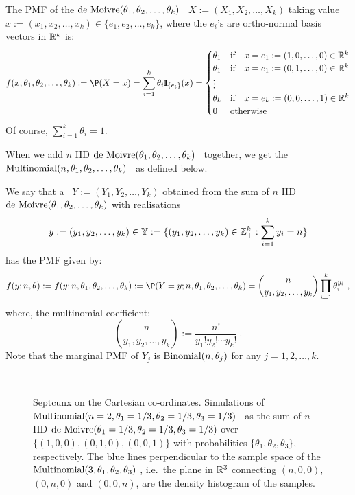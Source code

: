 \begin{model}\label{M:deMoivreRVec}
The PMF of the $\mbox{{\rm de~Moivre}}(\theta_1,\theta_2,\ldots,\theta_k)$ \rv~$X := (X_1,X_2,\ldots,X_k)$ taking value $x := (x_1,x_2,\ldots,x_k) \in \{e_1,e_2,\ldots,e_k\}$, where the $e_i$'s are ortho-normal basis vectors in $\mathbb{R}^k$ is:
\[
f(x;\theta_1,\theta_2,\ldots,\theta_k) := \P(X=x) = \sum_{i=1}^k \theta_i \BB{1}_{\{e_i\}}(x) =
\begin{cases}
\theta_1 & \text{if} \quad x=e_1:=(1,0,\ldots,0) \in \Rz^k \\
\theta_1 & \text{if} \quad x=e_1:=(0,1,\ldots,0) \in  \Rz^k \\
\vdots \\
\theta_k & \text{if} \quad x=e_k:=(0,0,\ldots,1) \in  \Rz^k \\
0 & \text{otherwise}
\end{cases}
\]
Of course, $\sum_{i=1}^k \theta_i = 1$.
\end{model}

When we add $n$ IID $\mbox{{\rm de~Moivre}}(\theta_1,\theta_2,\ldots,\theta_k)$ \rv~together, we get the $\mbox{{\rm Multinomial}}(n,\theta_1,\theta_2,\ldots,\theta_k)$ \rv~as defined below.

\begin{model}\label{M:Multinomial}
We say that a \rv~$Y:=(Y_1,Y_2,\ldots,Y_k)$ obtained from the sum of $n$ IID $\mbox{{\rm de~Moivre}}(\theta_1,\theta_2,\ldots,\theta_k)$  with realisations
$$y:=(y_1,y_2,\ldots,y_k) \in \mathbb{Y}:= \{(y_1,y_2,\ldots,y_k) \in \mathbb{Z}_+^k : \sum_{i=1}^k y_i = n\}$$ has the PMF given by:
\[
f(y;n,\theta) := f(y;n,\theta_1,\theta_2,\ldots,\theta_k) := \P(Y=y;n,\theta_1,\theta_2,\ldots,\theta_k) = \binom{n}{y_1,y_2,\ldots,y_k} \prod_{i=1}^k \theta_i^{y_i} \ ,
\]
where, the multinomial coefficient:
\[
 \binom{n}{y_1,y_2,\ldots,y_k} := \frac{n!}{y_1! y_2! \cdots y_k!} \ .
\]
Note that the marginal PMF of $Y_j$ is $\mbox{{\rm Binomial}}(n,\theta_j)$ for any $j=1,2,\ldots,k$.
\end{model}

\begin{figure}[htpb]
\caption{Septcunx on the Cartesian co-ordinates.  Simulations of $\mbox{{\rm Multinomial}}(n=2,\theta_1=1/3,\theta_2=1/3,\theta_3=1/3)$ \rv~as the sum of $n$ IID $\mbox{{\rm de~Moivre}}(\theta_1=1/3,\theta_2=1/3,\theta_3=1/3)$  over $\{(1,0,0),(0,1,0),(0,0,1)\}$ with probabilities $\{\theta_1,\theta_2,\theta_3\}$, respectively.  The blue lines perpendicular to the sample space of the $\mbox{{\rm Multinomial}}(3,\theta_1,\theta_2,\theta_3)$ \rv, i.e.~the plane in $\mathbb{R}^3$ connecting $(n,0,0)$, $(0,n,0)$ and $(0,0,n)$, are the density histogram of the samples.\label{F:MultinomSeptcunxn2n10r1000}}
\centering
\mbox{ \hspace{-2cm}
	    }
\end{figure}

